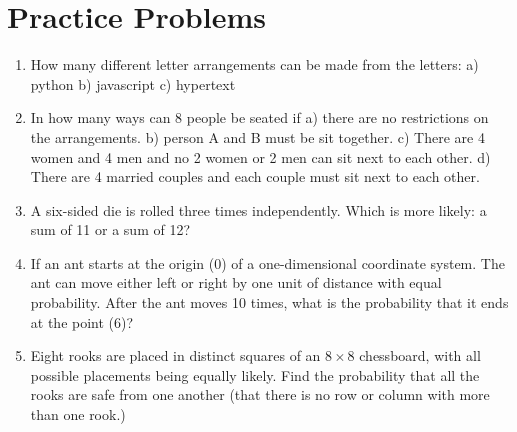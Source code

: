 \documentclass[11pt]{article}
\begin{document}
\section{Practice Problems}
\begin{enumerate}
  \item How many different letter arrangements can be made from the letters: a) python b) javascript c) hypertext
  \item In how many ways can 8 people be seated if a) there are no restrictions on the arrangements. b) person A and B must be sit together. c) There are 4 women and 4 men and no 2 women or 2 men can sit next to each other. d) There are 4 married couples and each couple must sit next to each other.
  \item A six-sided die is rolled three times independently. Which is more likely: a sum of 11 or a sum of 12?
  \item If an ant starts at the origin (0) of a one-dimensional coordinate system. The ant can move either left or right by one unit of distance with equal probability. After the ant moves 10 times, what is the probability that it ends at the point (6)?
  \item Eight rooks are placed in distinct squares of an $8 \times 8$ chessboard, with all possible placements being equally likely. Find the probability that all the rooks are safe from one another (that there is no row or column with more than one rook.)
\end{enumerate}
\end{document}
